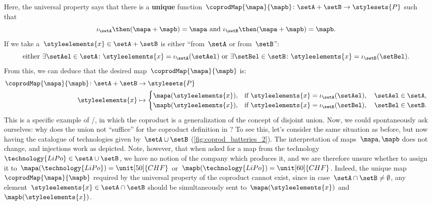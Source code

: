 \begin{example}
  Here, the universal property says that there is a \textbf{unique} function~$\coprodMap{\mapa}{\mapb}\colon \setA+\setB\to \stylesets{P}$ such that
  \begin{equation}\label{eq:exa-batt-factoring-maps}
    \iota_\setA\then (\mapa+ \mapb)=\mapa \text{ and }\iota_\setB\then (\mapa+ \mapb)=\mapb.
  \end{equation}
  If we take a~$\styleelements{x}\in \setA+\setB$ is either ``from~$\setA$ or from~$\setB$'':
  \begin{equation}\label{eq:exa-batt-explain-sum-map}
    \text{either } \exists \setAel\in \setA\colon \styleelements{x}=\iota_\setA(\setAel) \text{ or }\exists \setBel\in \setB\colon \styleelements{x}=\iota_\setB(\setBel).
  \end{equation}
  From this, we can deduce that the desired map~$\coprodMap{\mapa}{\mapb}$ is:
  \begin{equation}\label{eq:exa-batt-def-sum-map}
    \begin{aligned}
      \coprodMap{\mapa}{\mapb} \colon  \setA + \setB &\to \stylesets{P} \\
      \styleelements{x} &   \mapsto
      \begin{cases}
        \mapa(\styleelements{x}),& \text{if } \styleelements{x}=\iota_\setA(\setAel),\quad \setAel \in \setA, \\
        \mapb(\styleelements{x}),& \text{if } \styleelements{x}=\iota_\setB(\setBel),\quad \setBel \in \setB.
      \end{cases}
    \end{aligned}
  \end{equation}
  This is a specific example of \Set/\FinSet, in which the coproduct is a generalization of the concept of disjoint union.
  Now, we could spontaneously ask ourselves: why does the union not ``suffice'' for the coproduct definition in \Set?
  To see this, let's consider the same situation as before, but now having the catalogue of technologies given by~$\setA\cup \setB$ (\cref{fig:coprod_batteries_2}).
  The interpretation of maps~$\mapa,\mapb$ does not change, and injections work as depicted.
  Note, however, that when asked for a map from the technology~$\technology{LiPo}\in \setA\cup \setB$, we have no notion of the company which produces it, and we are therefore unsure whether to assign it to~$\mapa(\technology{LiPo})=\unit[50]{CHF}$ or~$\mapb(\technology{LiPo})=\unit[60]{CHF}$.
  Indeed, the unique map~$\coprodMap{\mapa}{\mapb}$ required by the universal property of the coproduct cannot exist, since in case~$\setA\cap \setB\neq \emptyset$, any element~$\styleelements{x}\in \setA\cap \setB$ should be simultaneously sent to~$\mapa(\styleelements{x})$ and~$\mapb(\styleelements{x})$.

\end{example}


